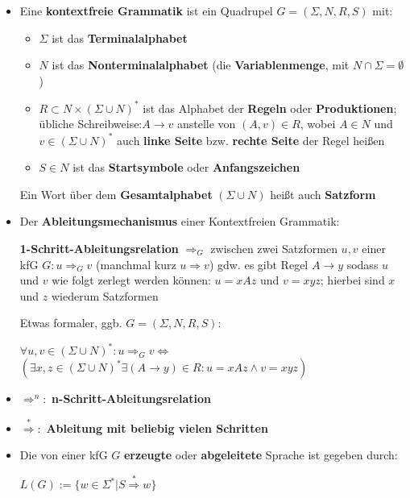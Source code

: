 \documentclass[12pt, a4paper]{article}
\begin{document}
	\begin{itemize}
		
		\item Eine \textbf{kontextfreie Grammatik} ist ein Quadrupel $G=(\Sigma,N,R,S)$ mit:
			\begin{itemize}
				\item $\Sigma$ ist das \textbf{Terminalalphabet}
				\item $N$ ist das \textbf{Nonterminalalphabet} (die \textbf{Variablenmenge}, mit $N\cap\Sigma=\emptyset$)
				\item $R\subset N\times(\Sigma\cup N)^{*}$ ist das Alphabet der \textbf{Regeln} oder \textbf{Produktionen}; übliche Schreibweise:$A\rightarrow v$ anstelle von $(A,v)\in R$, wobei $A\in N$ und $v\in(\Sigma\cup N)^{*}$ auch \textbf{linke Seite} bzw. \textbf{rechte Seite} der Regel heißen
				\item $S\in N$ ist das \textbf{Startsymbole} oder \textbf{Anfangszeichen}
			\end{itemize}
			\subitem Ein Wort über dem \textbf{Gesamtalphabet} $(\Sigma\cup N)$ heißt auch \textbf{Satzform}
	
		\item Der \textbf{Ableitungsmechanismus} einer Kontextfreien Grammatik:
			
			\subitem\textbf{1-Schritt-Ableitungsrelation} $\Rightarrow_{G}$ zwischen zwei Satzformen $u,v$ einer kfG $G: u\Rightarrow_{G} v$ (manchmal kurz $u\Rightarrow v$) gdw. es gibt Regel $A\rightarrow y$ sodass $u$ und $v$ wie folgt zerlegt werden können: $u=xAz$ und $v=xyz$; hierbei sind $x$ und $z$ wiederum Satzformen
			
			\subitem Etwas  formaler, ggb. $G=(\Sigma,N,R,S)$:
			\begin{center}
				$\forall u,v\in(\Sigma\cup N)^{*}:u\Rightarrow_{G}v\Leftrightarrow$\\$
				(\exists x,z\in(\Sigma\cup N)^{*}\exists(A\rightarrow y)\in R:u=xAz\wedge v=xyz)$
			\end{center}
		
		\item $\Rightarrow^{n}:$ \textbf{n-Schritt-Ableitungsrelation}
		\item $\stackrel{*}{\Rightarrow}:$ \textbf{Ableitung mit beliebig vielen Schritten}
		
		\item Die von einer kfG $G$ \textbf{erzeugte} oder \textbf{abgeleitete} Sprache ist gegeben durch:
			\begin{center} $L(G):=\{w\in\Sigma^{*}|S\stackrel{*}{\Rightarrow}w\}$ \end{center}
			

\end{itemize}
\end{document}
